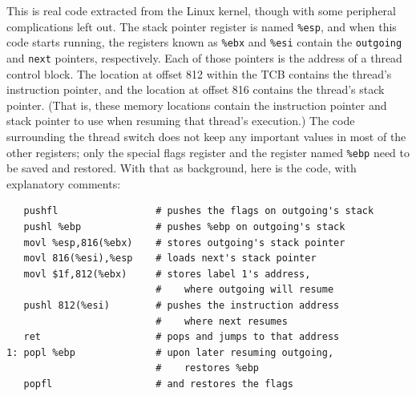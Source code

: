 This
is real code extracted from the Linux kernel, though with some
peripheral complications left out.  The
stack pointer register is named \verb|%esp|, and when this code starts running, the
registers known as \verb|%ebx| and \verb|%esi| contain the \verb|outgoing|
and \verb|next| pointers, respectively.  Each of those pointers is the
address of a
thread control block. The location at offset 812 within the TCB contains
the thread's instruction pointer, and the location at offset 816 contains
the thread's stack pointer.  (That is, these memory locations contain
the instruction pointer and stack pointer to use when resuming that
thread's execution.)  The code surrounding the thread switch does not
keep any important values in most of the other registers; only the
special flags register and the register named \verb|%ebp| need to
be saved and restored.  With that as background, here is the
code, with explanatory comments:
\begin{verbatim}
   pushfl                 # pushes the flags on outgoing's stack
   pushl %ebp             # pushes %ebp on outgoing's stack
   movl %esp,816(%ebx)    # stores outgoing's stack pointer
   movl 816(%esi),%esp    # loads next's stack pointer
   movl $1f,812(%ebx)     # stores label 1's address,
                          #    where outgoing will resume
   pushl 812(%esi)        # pushes the instruction address
                          #    where next resumes
   ret                    # pops and jumps to that address
1: popl %ebp              # upon later resuming outgoing,
                          #    restores %ebp
   popfl                  # and restores the flags
\end{verbatim}

